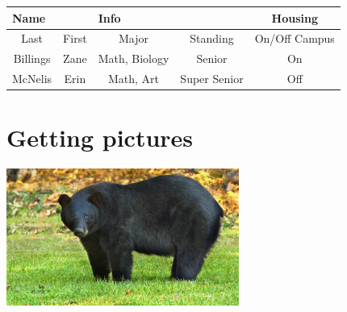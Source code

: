 \documentclass{article}
\begin{document}
\begin{tabular}{c|c|c|c|c}
\multicolumn{2}{l|}{Name} & \multicolumn{2}{l|}{Info} & Housing \\
\hline
Last & First & Major & Standing & On/Off Campus \\
\hline
Billings & Zane & Math, Biology & Senior & On \\
McNelis & Erin & Math, Art & Super Senior & Off
\end{tabular}

\section{Getting pictures}


\begin{center} %

\includegraphics[width = 3in]{my_image.jpg} %

\end{center}
\end{document}
